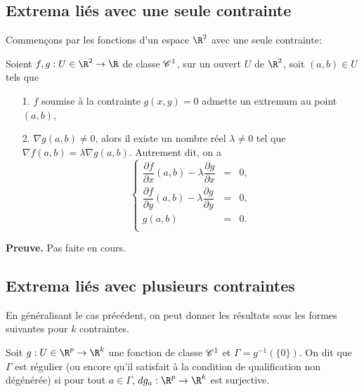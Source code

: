 \documentclass[12pt, class=report,crop=false]{standalone}
\begin{document}
{{{\subsection{Extrema liés avec une seule contrainte}

\noindent Commençons par les fonctions d'un espace $\R^2$ avec une seule contrainte:

\begin{theoreme}
\textcolor[rgb]{0.44,0.00,0.87}{
  Soient $f,g: U \in \R^2 \rightarrow \R$ de classe $\mathscr{C}^1$,
sur un ouvert $U$ de $\R^2$, soit $(a,b) \in U$ tels que
\begin{itemize}
\item[1.] $f$ soumise à la contrainte $g(x,y)=0$ admette un 
extremum au point $(a,b)$,
\item[2.] $\nabla g(a,b) \neq 0$,
alors il existe un nombre réel $\lambda \neq 0$ tel que 
$\nabla f(a,b) = \lambda \nabla g(a,b).$
Autrement dit, on a
\begin{equation*}
\left\{
\begin{array}{ccc}
\dfrac{\partial f}{\partial x}(a,b)-\lambda \dfrac{\partial g}{\partial x} & = & 0, \\ 
\dfrac{\partial f}{\partial y}(a,b)-\lambda \dfrac{\partial g}{\partial y}& = & 0, \\ 
g(a,b) & = & 0. \\ 
\end{array}\right.
\end{equation*}
\end{itemize} }
\end{theoreme}


{\textbf{Preuve.}} Pas faite en cours.

\subsection{Extrema liés avec plusieurs contraintes}
En généralisant le cas précédent, on peut donner les résultats sous les formes suivantes pour $k$ contraintes.


\begin{definition}
\textcolor[rgb]{0.98,0.00,0.00}{
  Soit $g: U \in \R^p \rightarrow \R^k$ une fonction de classe $\mathscr{C}^1$ et
$\Gamma=g^{-1}(\{0\})$. On dit que $\Gamma$ est r\'egulier (ou encore qu'il satisfait \`a la condition de
qualification non d\'eg\'en\'er\'ee) si pour tout $a \in \Gamma$, $dg_a: \R^p \rightarrow \R^k$ est surjective.}
\end{definition}

}}}
\end{document}
